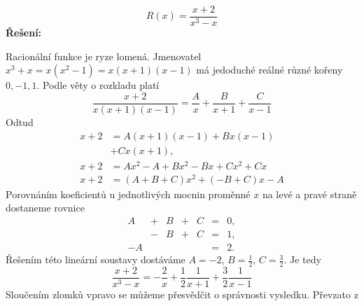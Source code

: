 \begin{mdframed}[style=mdexam]
  \begin{example}\label{MAI:exam136}
    \begin{equation*}
      R(x) = \dfrac{x + 2}{x^3 - x}
    \end{equation*}
    \noindent\textbf{Řešení:}

    Racionální funkce je ryze lomená. Jmenovatel \(x^3 + x = x(x^2-1) = x(x+1)(x-1)\) má jedoduché
    reálné různé kořeny \(0,-1,1\). Podle věty o rozkladu platí
    \begin{equation*}
      \dfrac{x+2}{x(x+1)(x-1)} = \dfrac{A}{x} + \dfrac{B}{x+1} + \dfrac{C}{x-1}
    \end{equation*}
    Odtud
    \begin{align}
      x+2 &= A(x+1)(x-1) + Bx(x-1)            \nonumber          \\ 
          &+ Cx(x+1),                         \label{mai:eq162}  \\
      x+2 &= Ax^2 - A +Bx^2 - Bx + Cx^2 + Cx  \nonumber          \\
      x+2 &= (A+B+C)x^2 + (-B+C)x - A         \nonumber
    \end{align}
    Porovnáním koeficientů u jednotlivých mocnin proměnné \(x\) na levé a pravé straně dostaneme
    rovnice 
    \begin{equation*}
      \begin{array}{rcrcrcl}
        A &+& B &+& C &=&0, \\
          &-& B &+& C &=&1, \\
       -A & &   & &   &=&2. 
      \end{array}   
    \end{equation*}
    Řešením této lineární soustavy dostáváme \(A = -2\), \(B = \frac{1}{2}\), \(C = \frac{3}{2}\).
    Je tedy 
    \begin{equation}\label{mai:eq163}
      \dfrac{x+2}{x^3-x} = -\dfrac{2}{x} + \dfrac{1}{2}\dfrac{1}{x+1} + \dfrac{3}{2}\dfrac{1}{x-1}
    \end{equation} 
    Sloučením zlomků vpravo se můžeme přesvědčit o správnosti vysledku. Převzato z
    \cite[p.~268]{Brabec1989}
  \end{example}
\end{mdframed}